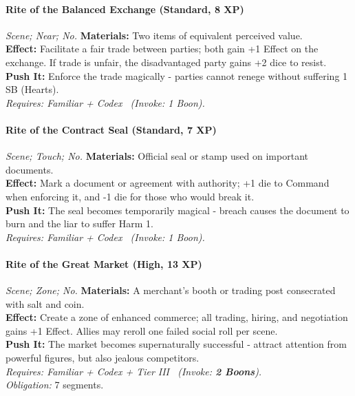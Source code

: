 \paragraph{Rite of the Balanced Exchange (Standard, 8 XP)} \emph{Scene; Near; No.}
\textbf{Materials:} Two items of equivalent perceived value. \\
\textbf{Effect:} Facilitate a fair trade between parties; both gain +1 Effect on the exchange. If trade is unfair, the disadvantaged party gains +2 dice to resist. \\
\textbf{Push It:} Enforce the trade magically - parties cannot renege without suffering 1 SB (Hearts). \\
\emph{Requires: Familiar + Codex \ (\textit{Invoke:} 1 Boon).}

\paragraph{Rite of the Contract Seal (Standard, 7 XP)} \emph{Scene; Touch; No.}
\textbf{Materials:} Official seal or stamp used on important documents. \\
\textbf{Effect:} Mark a document or agreement with authority; +1 die to Command when enforcing it, and -1 die for those who would break it. \\
\textbf{Push It:} The seal becomes temporarily magical - breach causes the document to burn and the liar to suffer Harm 1. \\
\emph{Requires: Familiar + Codex \ (\textit{Invoke:} 1 Boon).}

\paragraph{Rite of the Great Market (High, 13 XP)} \emph{Scene; Zone; No.}
\textbf{Materials:} A merchant's booth or trading post consecrated with salt and coin. \\
\textbf{Effect:} Create a zone of enhanced commerce; all trading, hiring, and negotiation gains +1 Effect. Allies may reroll one failed social roll per scene. \\
\textbf{Push It:} The market becomes supernaturally successful - attract attention from powerful figures, but also jealous competitors. \\
\emph{Requires: Familiar + Codex + Tier III \ (\textit{Invoke:} \textbf{2 Boons}).} \\
\emph{Obligation:} 7 segments.

